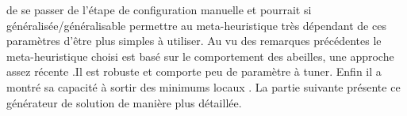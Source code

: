 de se passer de l’étape de configuration manuelle et pourrait si généralisée/généralisable
permettre au meta-heuristique très dépendant de ces paramètres d’être plus simples
à utiliser.
Au vu des remarques précédentes le meta-heuristique choisi est basé sur le
comportement des abeilles, une approche assez récente .Il est
robuste  et comporte peu de paramètre à tuner. Enfin il
a montré sa capacité à sortir des minimums locaux .
La partie suivante présente ce générateur de solution de manière plus détaillée.

